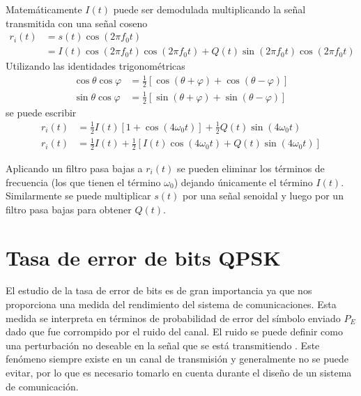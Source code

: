 Matem\'aticamente $I(t)$ puede ser demodulada multiplicando la se\~nal transmitida
con una se\~nal coseno
\begin{equation}
\begin{aligned}
r_i(t)&=s(t)\cos(2\pi f_0t)\\
&=I(t)\cos(2\pi f_0t)\cos(2\pi f_0t)+Q(t)\sin(2\pi f_0t)\cos(2\pi f_0t)
\end{aligned}
\end{equation}
Utilizando las identidades trigonom\'etricas
\begin{equation}
\begin{aligned}
\cos\theta\cos\varphi&=\frac{1}{2}[\cos(\theta+\varphi)+\cos(\theta-\varphi)]\\
\sin\theta\cos\varphi&=\frac{1}{2}[\sin(\theta+\varphi)+\sin(\theta-\varphi)]
\end{aligned}
\end{equation}
se puede escribir
\begin{equation}
\begin{aligned}
r_i(t)&=\frac{1}{2}I(t)[1+\cos(4\omega_0t)]+\frac{1}{2}Q(t)\sin(4\omega_0t)\\
r_i(t)&=\frac{1}{2}I(t)+\frac{1}{2}[I(t)\cos(4\omega_0t)+Q(t)\sin(4\omega_0t)]
\end{aligned}
\end{equation}

Aplicando un filtro pasa bajas a $r_i(t)$ se pueden eliminar los t\'erminos de
frecuencia (los que tienen el t\'ermino $\omega_0$) dejando \'unicamente el
t\'ermino $I(t)$. Similarmente se puede multiplicar $s(t)$ por una se\~nal
senoidal y luego por un filtro pasa bajas para obtener $Q(t)$.

\section{Tasa de error de bits QPSK}
El estudio de la tasa de error de bits es de gran importancia ya que nos proporciona una medida del
rendimiento del sistema de comunicaciones. Esta medida se interpreta en t\'erminos de probabilidad de
error del s\'imbolo enviado $P_E$ dado que fue corrompido por el ruido del canal. El ruido se puede
definir como una perturbaci\'on no deseable en la se\~nal que se est\'a transmitiendo \cite{sklar}. Este fen\'omeno
siempre existe en un canal de transmisi\'on y generalmente no se puede evitar, por lo que es
necesario tomarlo en cuenta durante el dise\~no de un sistema de comunicaci\'on.

